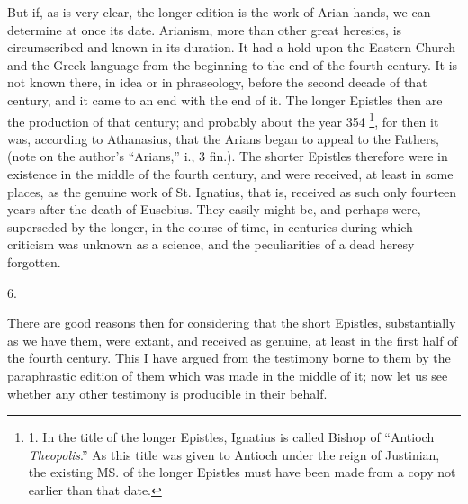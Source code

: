 But if, as is very clear, the
longer edition is the work of Arian hands, we can determine at once
its date. Arianism, more than other great heresies, is circumscribed
and known in its duration. It had a hold upon the Eastern Church and
the Greek language from the beginning to the end of the fourth
century. It is not known there, in idea or in phraseology, before the
second decade of that century, and it came to an end with the end of
it. The longer Epistles then are the production of that century; and
probably about the year 354 \footnote{1. In the title of the longer
Epistles, Ignatius is called Bishop of ``Antioch \emph{Theopolis}.'' As
this title was given to Antioch under the reign of Justinian, the
existing MS. of the longer Epistles must have been made from a copy
not earlier than that date.},
for then it was, according to Athanasius, that the Arians began to
appeal to the Fathers, (note on the author's ``Arians,'' i., 3 fin.).
The shorter Epistles therefore were in existence in the middle of the
fourth century, and were received, at least in some places, as the
genuine work of St. Ignatius, that is, received as such only fourteen
years after the death of Eusebius. They easily might be, and
perhaps were, superseded by the longer, in the course of time, in
centuries during which criticism was unknown as a science, and the
peculiarities of a dead heresy forgotten.

6.

There are good reasons then
for considering that the short Epistles, substantially as we have
them, were extant, and received as genuine, at least in the first half
of the fourth century. This I have argued from the testimony borne to
them by the paraphrastic edition of them which was made in the middle
of it; now let us see whether any other testimony is producible in
their behalf.

